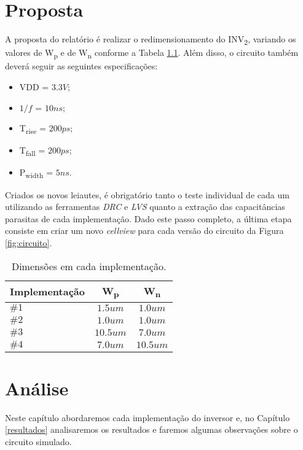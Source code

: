 \documentclass{iiufrgs}
\begin{document}
\chapter{Proposta}\label{proposta}
A proposta do relatório é realizar o redimensionamento do INV\textsubscript{2}, variando os valores de W\textsubscript{p} e de W\textsubscript{n} conforme a Tabela \ref{tab:imp}.
Além disso, o circuito também deverá seguir as seguintes especificações:

\begin{itemize}[noitemsep]
    \setlength{\itemindent}{1em}
    \item[] VDD = $3.3 V$;
    \item[] $1/f$ = $10ns$;
    \item[] T\textsubscript{rise} = $200ps$;
    \item[] T\textsubscript{fall} = $200ps$;
    \item[] P\textsubscript{width} = $5ns$.
\end{itemize}

Criados os novos leiautes, é obrigatório tanto o teste individual de cada um utilizando as ferramentas \textit{DRC} e \textit{LVS} quanto a extração das capacitâncias parasitas de cada implementação.
Dado este passo completo, a última etapa consiste em criar um novo \textit{cellview} para cada versão do circuito da Figura \ref{fig:circuito}.

\begin{table}[ht]
    \centering
    \caption{Dimensões em cada implementação.}
    \label{tab:imp}
    \begin{tabular}{l c c}
        \hline
        Implementação
        & W\textsubscript{p}
        & W\textsubscript{n} \\ \hline
        $\#1$ & $1.5 um$     & $1.0 um$     \\ 
        $\#2$ & $1.0 um$     & $1.0 um$     \\ 
        $\#3$ & $10.5 um$    & $7.0 um$     \\ 
        $\#4$ & $7.0 um$     & $10.5 um$    \\ \hline
    \end{tabular}
\end{table}

\chapter{Análise}\label{analise}
Neste capítulo abordaremos cada implementação do inversor e, no Capítulo \ref{resultados} analisaremos os resultados e faremos algumas observações sobre o circuito simulado.
\end{document}

